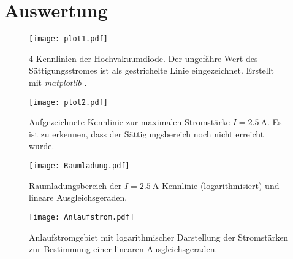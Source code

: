 \section{Auswertung}
\label{sec:Auswertung}

\begin{figure}
  \centering
  \texttt{[image: plot1.pdf]}
  \caption{4 Kennlinien der Hochvakuumdiode. Der ungefähre Wert des Sättigungsstromes ist als gestrichelte Linie eingezeichnet.
           Erstellt mit \textit{matplotlib} \cite{matplotlib}.}
  \label{fig:plot}
\end{figure}


\begin{figure}
  \centering
  \texttt{[image: plot2.pdf]}
  \caption{Aufgezeichnete Kennlinie zur maximalen Stromstärke $I = \qty{2.5}{\ampere}$. Es ist zu erkennen, dass der Sättigungsbereich noch nicht erreicht wurde.}
  \label{fig:plot2}
\end{figure}

\begin{figure}
  \centering
  \texttt{[image: Raumladung.pdf]}
  \caption{Raumladungsbereich der $I = \qty{2.5}{\ampere}$ Kennlinie (logarithmisiert) und lineare Ausgleichsgeraden.}
  \label{fig:Raumladung}
\end{figure}

\begin{figure}
  \centering
  \texttt{[image: Anlaufstrom.pdf]}
  \caption{Anlaufstromgebiet mit logarithmischer Darstellung der Stromstärken zur Bestimmung einer linearen Ausgleichsgeraden.}
  \label{fig:Anlaufstrom}
\end{figure}
